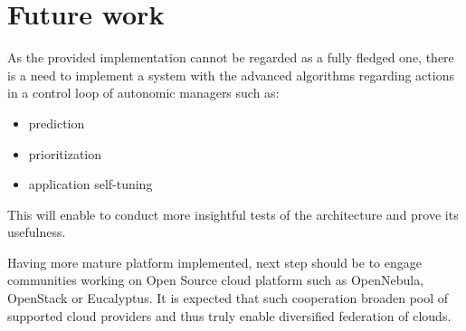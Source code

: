 \section{Future work}
As the provided implementation cannot be regarded as a fully fledged one, there is a need to implement a system with the advanced algorithms regarding actions in a control loop of autonomic managers such as:
\begin{itemize}
  \item prediction
  \item prioritization
  \item application self-tuning
\end{itemize}
This will enable to conduct more insightful tests of the architecture and prove its usefulness.

Having more mature platform implemented, next step should be to engage communities working on Open Source cloud platform such as OpenNebula, OpenStack or Eucalyptus. It is expected that such cooperation broaden pool of supported cloud providers and thus truly enable diversified federation of clouds.

